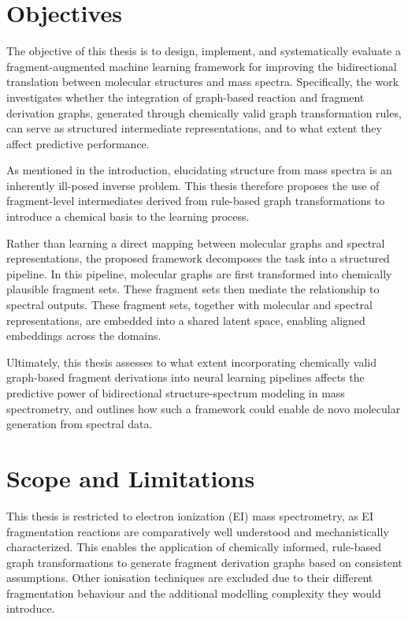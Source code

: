 \section{Objectives}
The objective of this thesis is to design, implement, and systematically evaluate a fragment-augmented machine learning framework for improving the bidirectional translation between molecular structures and mass spectra.
Specifically, the work investigates whether the integration of graph-based reaction and fragment derivation graphs, generated through chemically valid graph transformation rules, can serve as structured intermediate representations, and to what extent they affect predictive performance.

As mentioned in the introduction, elucidating structure from mass spectra is an inherently ill-posed inverse problem.
This thesis therefore proposes the use of fragment-level intermediates derived from rule-based graph transformations to introduce a chemical basis to the learning process.

Rather than learning a direct mapping between molecular graphs and spectral representations, the proposed framework decomposes the task into a structured pipeline.
In this pipeline, molecular graphs are first transformed into chemically plausible fragment sets.
These fragment sets then mediate the relationship to spectral outputs.
These fragment sets, together with molecular and spectral representations, are embedded into a shared latent space, enabling aligned embeddings across the domains.

Ultimately, this thesis assesses to what extent incorporating chemically valid graph-based fragment derivations into neural learning pipelines affects the predictive power of bidirectional structure-spectrum modeling in mass spectrometry, and outlines how such a framework could enable de novo molecular generation from spectral data.


\section{Scope and Limitations}

This thesis is restricted to electron ionization (EI) mass spectrometry, as EI fragmentation reactions are comparatively well understood and mechanistically characterized. \cite[ch.~4\&~8]{McLafferty1993}
This enables the application of chemically informed, rule-based graph transformations to generate fragment derivation graphs based on consistent assumptions.
Other ionisation techniques are excluded due to their different fragmentation behaviour and the additional modelling complexity they would introduce.

